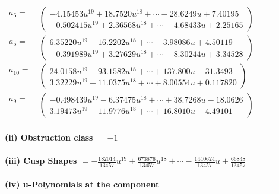 \documentclass[1p]{elsarticle_modified}
\theoremstyle{definition}
\begin{document}
\begin{tabular}{m{7pt} m{180pt} m{7pt} m{180pt} }
\flushright $a_{6}=$&$\begin{pmatrix}-4.15453 u^{19}+18.7520 u^{18}+\cdots-28.6249 u+7.40195\\-0.502415 u^{19}+2.36568 u^{18}+\cdots-4.68433 u+2.25165\end{pmatrix}$ \\
\flushright $a_{5}=$&$\begin{pmatrix}6.35220 u^{19}-16.2202 u^{18}+\cdots-3.98086 u+4.50119\\-0.391989 u^{19}+3.27629 u^{18}+\cdots-8.30244 u+3.34528\end{pmatrix}$ \\
\flushright $a_{10}=$&$\begin{pmatrix}24.0158 u^{19}-93.1582 u^{18}+\cdots+137.800 u-31.3493\\3.32229 u^{19}-11.0375 u^{18}+\cdots+8.00554 u+0.117820\end{pmatrix}$ \\
\flushright $a_{9}=$&$\begin{pmatrix}-0.498439 u^{19}-6.37475 u^{18}+\cdots+38.7268 u-18.0626\\3.19473 u^{19}-11.9776 u^{18}+\cdots+16.8010 u-4.49101\end{pmatrix}$\\&\end{tabular}
\flushleft \textbf{(ii) Obstruction class $= -1$}\\~\\
\flushleft \textbf{(iii) Cusp Shapes $= -\frac{182014}{13457} u^{19}+\frac{673876}{13457} u^{18}+\cdots-\frac{1440624}{13457} u+\frac{66848}{13457}$}\\~\\
\newpage\renewcommand{\arraystretch}{1}
\flushleft \textbf{(iv) u-Polynomials at the component}\newline \\
\end{document}
